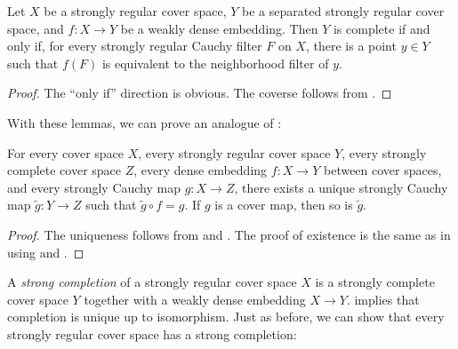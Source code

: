 \documentclass[reqno]{amsart}
\theoremstyle{definition}
\theoremstyle{remark}
\numberwithin{figure}{section}
\begin{document}
\begin{lem}
Let $X$ be a strongly regular cover space, $Y$ be a separated strongly regular cover space, and $f : X \to Y$ be a weakly dense embedding.
Then $Y$ is complete if and only if, for every strongly regular Cauchy filter $F$ on $X$, there is a point $y \in Y$ such that $f(F)$ is equivalent to the neighborhood filter of $y$.
\end{lem}
\begin{proof}
The ``only if'' direction is obvious.
The coverse follows from .
\end{proof}

With these lemmas, we can prove an analogue of :

\begin{thm}
For every cover space $X$, every strongly regular cover space $Y$, every strongly complete cover space $Z$, every dense embedding $f : X \to Y$ between cover spaces, and every strongly Cauchy map $g : X \to Z$,
there exists a unique strongly Cauchy map $\widetilde{g} : Y \to Z$ such that $\widetilde{g} \circ f = g$.
If $g$ is a cover map, then so is $\widetilde{g}$.
\end{thm}
\begin{proof}
The uniqueness follows from  and .
The proof of existence is the same as in  using  and .
\end{proof}

A \emph{strong completion} of a strongly regular cover space $X$ is a strongly complete cover space $Y$ together with a weakly dense embedding $X \to Y$.
 implies that completion is unique up to isomorphism.
Just as before, we can show that every strongly regular cover space has a strong completion:
\end{document}

